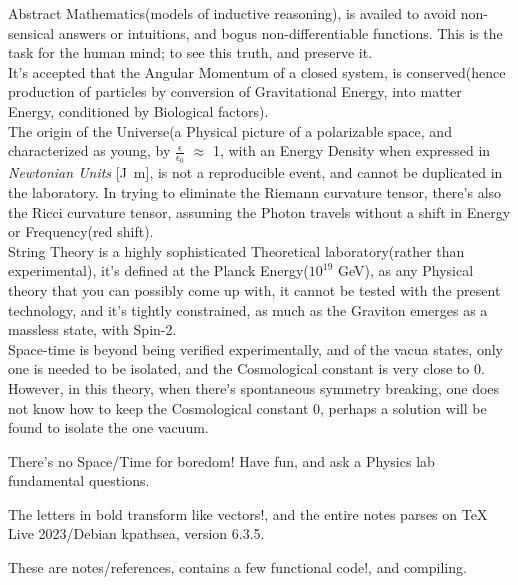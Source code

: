 \documentclass[a4paper, 10pt, onepage]{elegantbook}
\begin{document}
Abstract Mathematics(models of inductive reasoning), is availed to avoid non-sensical answers or intuitions, and bogus non-differentiable functions. This is the task for the human mind; to see this truth, and preserve it.  \\
It's accepted that the Angular Momentum of a closed system, is conserved(hence production of particles by conversion of Gravitational Energy, into matter Energy, conditioned by Biological factors).  \\
The origin of the Universe(a Physical picture of a polarizable space, and characterized as young, by $\frac{\epsilon} {\epsilon_0}$ $\approx$ 1, with an Energy Density when expressed in \emph{Newtonian Units} [\unit{\joule\meter}], is not a reproducible event, and cannot be duplicated in the laboratory. In trying to eliminate the Riemann curvature tensor, there's also the Ricci curvature tensor, assuming the Photon travels without a shift in Energy or Frequency(red shift).  \\
String Theory is a highly sophisticated Theoretical laboratory(rather than experimental), it's defined at the Planck Energy($10^{19}$ GeV), as any Physical theory that you can possibly come up with, it cannot be tested with the present technology, and it's tightly constrained, as much as the Graviton emerges as a massless state, with Spin-2.  \\
Space-time is beyond being verified experimentally, and of the vacua states, only one is needed to be isolated, and the  Cosmological constant is very close to 0. However, in this theory, when there's spontaneous symmetry breaking, one does not know how to keep the Cosmological constant 0, perhaps a solution will be found to isolate the one vacuum.

There's no Space/Time for boredom! Have fun, and ask a Physics lab fundamental questions.

The letters in bold transform like vectors!, and the entire notes parses on TeX Live 2023/Debian kpathsea, version 6.3.5.

These are notes/references, contains a few functional code!, and compiling.
\end{document}
